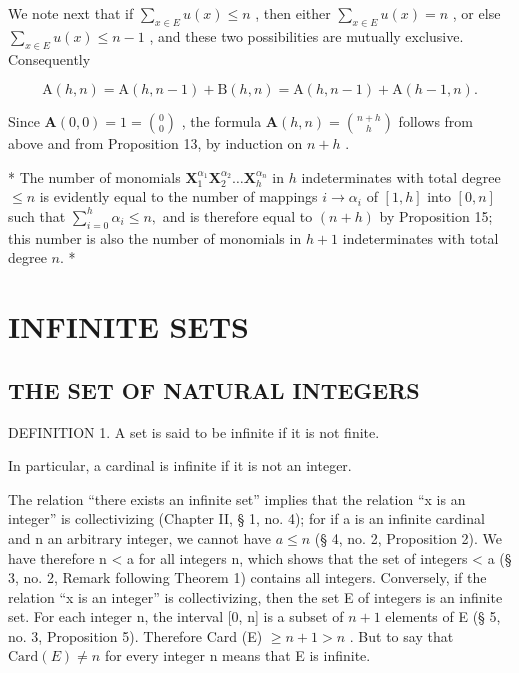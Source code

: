 We note next that if \(\sum_{x\in E}u(x)\leqslant n\) , then either \(\sum_{x\in E}u(x) = n\) , or else \(\sum_{x\in E}u(x)\leqslant n - 1\) , and these two possibilities are mutually exclusive. Consequently

\[
\mathrm{A} (h, n) = \mathrm{A} (h, n - 1) + \mathrm{B} (h, n) = \mathrm{A} (h, n - 1) + \mathrm{A} (h - 1, n).
\]

Since \(\mathbf{A}(0,0) = 1 = \binom{0}{0}\) , the formula \(\mathbf{A}(h,n) = \binom{n + h}{h}\) follows from above and from Proposition 13, by induction on \(n + h\) .

* The number of monomials \(\mathbf{X}_1^{\alpha_1}\mathbf{X}_2^{\alpha_2}\ldots \mathbf{X}_h^{\alpha_n}\) in \(h\) indeterminates with total degree \(\leqslant n\) is evidently equal to the number of mappings \(i\to \alpha_{i}\) of \([1,h]\) into \([0,n]\) such that \(\sum_{i = 0}^{h}\alpha_{i}\leqslant n,\) and is therefore equal to \((n + h)\) by Proposition 15; this number is also the number of monomials in \(h + 1\) indeterminates with total degree \(n.\) *

\section{INFINITE SETS}

\subsection{THE SET OF NATURAL INTEGERS}

DEFINITION 1. A set is said to be infinite if it is not finite.

In particular, a cardinal is infinite if it is not an integer.

The relation ``there exists an infinite set'' implies that the relation ``x is an integer'' is collectivizing (Chapter II, § 1, no. 4); for if a is an infinite cardinal and n an arbitrary integer, we cannot have \(a \leqslant n\) (§ 4, no. 2, Proposition 2). We have therefore n \textless{} a for all integers n, which shows that the set of integers \textless{} a (§ 3, no. 2, Remark following Theorem 1) contains all integers. Conversely, if the relation ``x is an integer'' is collectivizing, then the set E of integers is an infinite set. For each integer n, the interval {[}0, n{]} is a subset of \(n + 1\) elements of E (§ 5, no. 3, Proposition 5). Therefore Card (E) \(\geqslant n + 1 > n\) . But to say that \(\text{Card}(E) \neq n\) for every integer n means that E is infinite.

